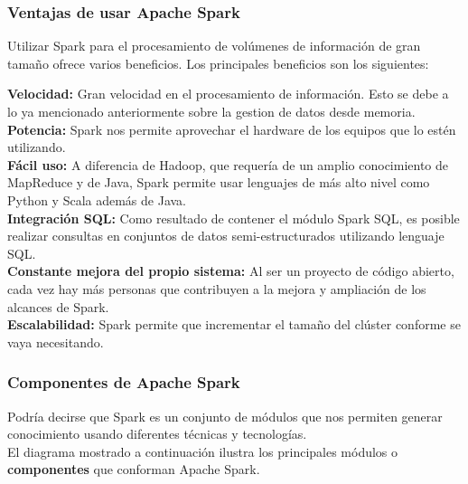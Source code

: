 \subsubsection{Ventajas de usar Apache Spark}
Utilizar Spark para el procesamiento de volúmenes de información de gran tamaño ofrece varios beneficios. Los principales beneficios son los siguientes:\\

\begin{UClist}
	\UCli \textbf{Velocidad:} Gran velocidad en el procesamiento de información. Esto se debe a lo ya mencionado anteriormente sobre la gestion de datos desde memoria.\\
	\UCli \textbf{Potencia:} Spark nos permite aprovechar el hardware de los equipos que lo estén utilizando.\\

	\UCli \textbf{Fácil uso:} A diferencia de Hadoop, que requería de un amplio conocimiento de MapReduce y de Java, Spark permite usar lenguajes de más alto nivel como Python y Scala además de Java.\\

	\UCli \textbf{Integración SQL:} Como resultado de contener el módulo Spark SQL, es posible realizar consultas en conjuntos de datos semi-estructurados utilizando lenguaje SQL.\\

	\UCli \textbf{Constante mejora del propio sistema:} Al ser un proyecto de código abierto, cada vez hay más personas que contribuyen a la mejora y ampliación de los alcances de Spark.\\

	\UCli \textbf{Escalabilidad:} Spark permite que incrementar el tamaño del clúster conforme se vaya necesitando.\\
\end{UClist}
\newpage
\subsubsection{Componentes de Apache Spark}
Podría decirse que Spark es un conjunto de módulos que nos permiten generar conocimiento usando diferentes técnicas y tecnologías.\\

El diagrama mostrado a continuación ilustra los principales módulos o \textbf{componentes} que conforman Apache Spark.\\

